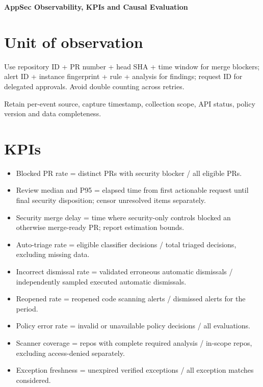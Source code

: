 \documentclass[11pt,letterpaper]{article}
\begin{document}
\begin{center}
{\LARGE\bfseries AppSec Observability, KPIs and Causal Evaluation}\par
\vspace{5pt}{\large Measure throughput improvement without hiding risk}\par
\vspace{9pt}{\small Engineering reference | Proposed design | Not a deployment or approval record}\par
\end{center}
\tableofcontents
\clearpage
\section{Unit of observation}
Use repository ID + PR number + head SHA + time window for merge blockers; alert ID + instance fingerprint + rule + analysis for findings; request ID for delegated approvals. Avoid double counting across retries.

Retain per-event source, capture timestamp, collection scope, API status, policy version and data completeness.


\section{KPIs}
\begin{itemize}
\item Blocked PR rate = distinct PRs with security blocker / all eligible PRs.
\item Review median and P95 = elapsed time from first actionable request until final security disposition; censor unresolved items separately.
\item Security merge delay = time where security-only controls blocked an otherwise merge-ready PR; report estimation bounds.
\item Auto-triage rate = eligible classifier decisions / total triaged decisions, excluding missing data.
\item Incorrect dismissal rate = validated erroneous automatic dismissals / independently sampled executed automatic dismissals.
\item Reopened rate = reopened code scanning alerts / dismissed alerts for the period.
\item Policy error rate = invalid or unavailable policy decisions / all evaluations.
\item Scanner coverage = repos with complete required analysis / in-scope repos, excluding access-denied separately.
\item Exception freshness = unexpired verified exceptions / all exception matches considered.
\end{itemize}
\end{document}
